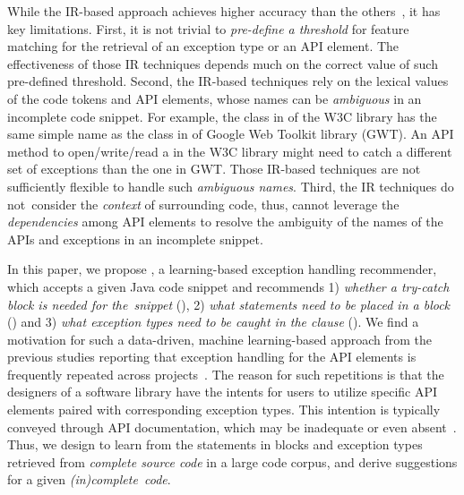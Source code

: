While the IR-based approach achieves higher accuracy than the
others~\cite{xrank-fse20}, it has key limitations. First, it is not
trivial to {\em pre-define a threshold} for feature matching for the
retrieval of an exception type or an API element. The effectiveness of
those IR techniques depends much on the correct value of such
pre-defined threshold. Second, the IR-based techniques rely on the
lexical values of the code tokens and API elements, whose names can be
{\em ambiguous} in an incomplete code snippet. For example, the
 class in  of the W3C library has
the same simple name as the  class in
 of Google Web
Toolkit library (GWT). An API method to open/write/read a
 in the W3C library might need to catch a different set
of exceptions than the one in GWT. Those IR-based techniques are not
sufficiently flexible to handle such {\em ambiguous names}. Third, the
IR techniques do not~con\-sider the {\em context} of surrounding
  code, thus, cannot leverage the {\em dependencies} among API
elements to resolve the ambiguity of the names of the APIs and
  exceptions in an incomplete snippet.

In this paper, we propose {\tool}, a learning-based exception handling
recommender, which accepts a given Java code snippet and recommends 1)
{\em whether a try-catch block is needed for the~snippet} ({\xblock}),
2) {\em what statements need to be placed in a  block}
({\xstate}) and 3) {\em what exception types need to be caught in the
   clause} ({\xtype}).  We find a motivation for such a
data-driven, machine learning-based approach from the previous studies
reporting that exception handling for the API elements is frequently
repeated across 
projects~\cite{chanchal-scam14,zhong-jss18}. The reason for such
repetitions is that the designers of a software library have the
intents for users to utilize specific API elements paired with
corresponding exception types. This intention is typically conveyed
through API documentation, which may be inadequate or even
absent~\cite{dagenais-fse10}.
%
Thus, we design {\tool} to learn from the statements
in  blocks and exception types retrieved from {\em
  complete source code} in a large code corpus, and derive suggestions
for a given {\em (in)complete~code}.

